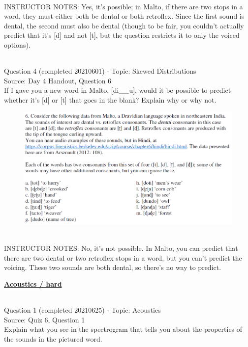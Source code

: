 \documentclass[12pt]{article}
\begin{document}
~\\
INSTRUCTOR NOTES: Yes, it's possible; in Malto, if there are two stops in a word, they must either both be dental or both retroflex. Since the first sound is dental, the second must also be dental (though to be fair, you couldn't actually predict that it's [d] and not [t], but the question restricts it to only the voiced options).


~\\

{\large Question 4} (completed 20210601) - Topic: Skewed Distributions\\
Source: Day 4 Handout, Question 6\\

If I gave you a new word in Malto, [di\_\_u], would it be possible to predict whether it's [d] or [t] that goes in the blank? Explain why or why not.\\

\begin{figure}[H]
\includegraphics{../images/malto.png}
\end{figure}

~\\
INSTRUCTOR NOTES: No, it's not possible. In Malto, you can predict that there are two dental or two retroflex stops in a word, but you can't predict the voicing. These two sounds are both dental, so there's no way to predict.


\newpage\textbf{\underline{\huge Acoustics / hard\\}}

~\\

{\large Question 1} (completed 20210625) - Topic: Acoustics\\
Source: Quiz 6, Question 1\\

Explain what you see in the spectrogram that tells you about the properties of the sounds in the pictured word.\\
\end{document}
